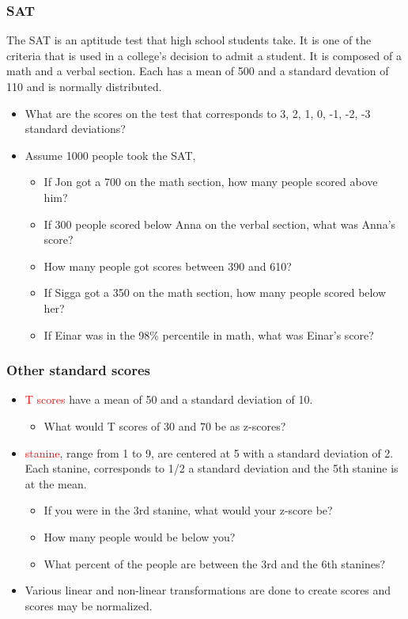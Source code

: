 \documentclass[dvipsnames]{beamer}\usepackage[]{graphicx}\usepackage[]{color}
\begin{document}
\begin{frame}
  \frametitle{SAT}
  
  The SAT is an aptitude test that high school students take. It is one of the criteria that is used in a college's decision to admit a student. It is composed of a math and a verbal section. Each has a mean of 500 and a standard devation of 110 and is normally distributed. 
  \begin{itemize}
  \item<1-> What are the scores on the test that corresponds to 3, 2, 1, 0, -1, -2, -3 standard deviations?
  \item<2-> Assume 1000 people took the SAT,
  \begin{itemize}
    \item<3-> If Jon got a 700 on the math section, how many people scored above him?
    \item<4-> If 300 people scored below Anna on the verbal section, what was Anna's score?
    \item<5-> How many people got scores between 390 and 610?
    \item<6-> If Sigga got a 350 on the math section, how many people scored below her?
    \item<7-> If Einar was in the 98\% percentile in math, what was Einar's score?
  \end{itemize}
  \end{itemize}
\end{frame}


\begin{frame}
\frametitle{Other standard scores}
\begin{itemize}
  \item<1-> \textcolor{red}{T scores} have a mean of 50 and a standard deviation of 10.
    \begin{itemize}
      \item<2-> What would T scores of 30 and 70 be as z-scores?
    \end{itemize}
    \item<3-> \textcolor{red}{stanine}, range from 1 to 9, are centered at 5 with a standard deviation of 2. Each stanine, corresponds to 1/2 a standard deviation and the 5th stanine is at the mean.
      \begin{itemize}
        \item<4-> If you were in the 3rd stanine, what would your z-score be?
        \item<5-> How many people would be below you?
        \item<6-> What percent of the people are between the 3rd and the 6th stanines?
      \end{itemize}
      \item<7-> Various linear and non-linear transformations are done to create scores and scores may be normalized.
\end{itemize}
\end{frame}
\end{document}
